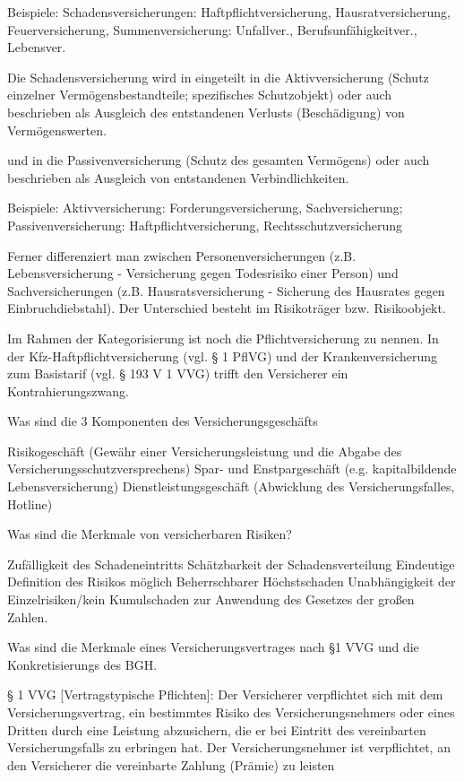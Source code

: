Beispiele: 
Schadensversicherungen: 
Haftpflichtversicherung, 
Hausratversicherung, 
Feuerversicherung, 
Summenversicherung:
Unfallver.,
Berufsunfähigkeitver.,
Lebensver.

Die Schadensversicherung wird in eingeteilt in
die Aktivversicherung (Schutz einzelner Vermögensbestandteile; spezifisches Schutzobjekt) 
oder auch beschrieben als 
Ausgleich des entstandenen Verlusts (Beschädigung) von Vermögenswerten.

und in die Passivenversicherung (Schutz des gesamten Vermögens)
oder auch beschrieben als Ausgleich von entstandenen Verbindlichkeiten.

Beispiele: 
Aktivversicherung: 
Forderungsversicherung, Sachversicherung;
Passivenversicherung: 
Haftpflichtversicherung, Rechtsschutzversicherung

Ferner differenziert man zwischen Personenversicherungen (z.B. Lebensversicherung - Versicherung gegen Todesrisiko einer Person) und 
Sachversicherungen (z.B. Hausratsversicherung - Sicherung des Hausrates gegen Einbruchdiebstahl). 
Der Unterschied besteht im Risikoträger bzw. Risikoobjekt.

Im Rahmen der Kategorisierung ist noch die Pflichtversicherung zu nennen. 
In der Kfz-Haftpflichtversicherung (vgl. § 1 PflVG) und der Krankenversicherung zum Basistarif (vgl. § 193 V 1 VVG) trifft den Versicherer 
ein Kontrahierungszwang.


Was sind die 3 Komponenten des Versicherungsgeschäfts

Risikogeschäft (Gewähr einer Versicherungsleistung und die Abgabe des Versicherungsschutzversprechens)
Spar- und Enstpargeschäft (e.g. kapitalbildende Lebensversicherung)
Dienstleistungsgeschäft (Abwicklung des Versicherungsfalles, Hotline)


Was sind die Merkmale von versicherbaren Risiken?

Zufälligkeit des Schadeneintritts
Schätzbarkeit der Schadensverteilung
Eindeutige Definition des Risikos möglich
Beherrschbarer Höchstschaden
Unabhängigkeit der Einzelrisiken/kein Kumulschaden zur Anwendung des Gesetzes der großen Zahlen.


Was sind die Merkmale eines Versicherungsvertrages nach §1 VVG und die Konkretisierungs des BGH.

§ 1 VVG [Vertragstypische Pflichten]: Der Versicherer
verpflichtet sich mit dem Versicherungsvertrag, ein
bestimmtes Risiko des Versicherungsnehmers oder
eines Dritten durch eine Leistung abzusichern, die er bei
Eintritt des vereinbarten Versicherungsfalls zu erbringen
hat. Der Versicherungsnehmer ist verpflichtet, an den
Versicherer die vereinbarte Zahlung (Prämie) zu leisten

